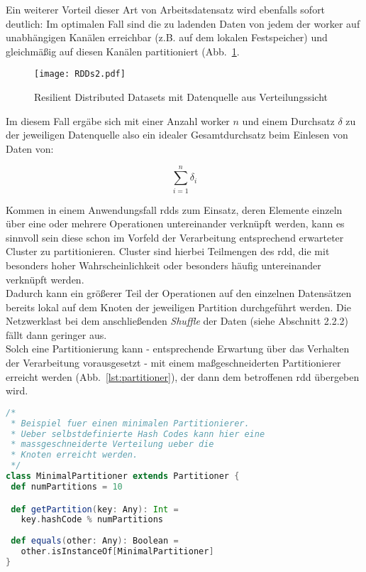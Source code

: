 Ein weiterer Vorteil dieser Art von Arbeitsdatensatz wird ebenfalls sofort deutlich: Im optimalen Fall sind die zu ladenden Daten von jedem der \gls{worker} auf unabhängigen Kanälen erreichbar (z.B. auf dem lokalen Festspeicher) und gleichmäßig auf diesen Kanälen partitioniert (Abb.~\ref{fig:rdds2}.\\

\begin{figure}[h!]
	\centering
  \texttt{[image: RDDs2.pdf]}
	\caption{Resilient Distributed Datasets mit Datenquelle aus Verteilungssicht}
	\label{fig:rdds2}
\end{figure}

Im diesem Fall ergäbe sich mit einer Anzahl \gls{worker} $n$ und einem Durchsatz $\delta$ zu der jeweiligen Datenquelle also ein idealer Gesamtdurchsatz beim Einlesen von Daten von:

\begin{equation}
	\sum_{i=1}^{n} \delta_i
\end{equation}

Kommen in einem Anwendungsfall \gls{rdd}s zum Einsatz, deren Elemente einzeln über eine oder mehrere Operationen untereinander verknüpft werden, kann es sinnvoll sein diese schon im Vorfeld der Verarbeitung entsprechend erwarteter Cluster zu partitionieren. Cluster sind hierbei Teilmengen des \gls{rdd}, die mit besonders hoher Wahrscheinlichkeit oder besonders häufig untereinander verknüpft werden.\\

Dadurch kann ein größerer Teil der Operationen auf den einzelnen Datensätzen bereits lokal auf dem Knoten der jeweiligen Partition durchgeführt werden. Die Netzwerklast bei dem anschließenden \textit{Shuffle} der Daten (siehe Abschnitt 2.2.2) fällt dann geringer aus.\\

Solch eine Partitionierung kann - entsprechende Erwartung über das Verhalten der Verarbeitung vorausgesetzt - mit einem maßgeschneiderten Partitionierer erreicht werden (Abb.~\ref{lst:partitioner}), der dann dem betroffenen \gls{rdd} übergeben wird.\\

\begin{lstlisting}[language=Scala,caption={Beispiel: Minimaler Partitionierer},label={lst:partitioner}]
/*
 * Beispiel fuer einen minimalen Partitionierer. 
 * Ueber selbstdefinierte Hash Codes kann hier eine 
 * massgeschneiderte Verteilung ueber die 
 * Knoten erreicht werden.
 */
class MinimalPartitioner extends Partitioner {
 def numPartitions = 10

 def getPartition(key: Any): Int =
   key.hashCode % numPartitions
	
 def equals(other: Any): Boolean =
   other.isInstanceOf[MinimalPartitioner]
}
\end{lstlisting}

